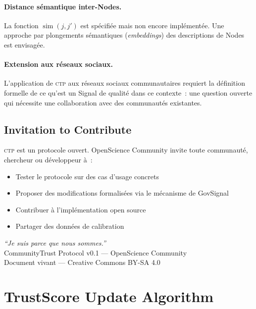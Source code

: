 \documentclass[12pt,a4paper]{article}
\theoremstyle{definition}
\theoremstyle{plain}
\theoremstyle{remark}
\newcommand{\CTP}{\textsc{ctp}}
\newcommand{\1}{\mathbf{1}}
\begin{document}
\paragraph{Distance sémantique inter-Nodes.}
La fonction $\operatorname{sim}(j, j')$ est spécifiée mais non encore
implémentée. Une approche par plongements sémantiques (\textit{embeddings}) des
descriptions de Nodes est envisagée.

\paragraph{Extension aux réseaux sociaux.}
L'application de \CTP{} aux réseaux sociaux communautaires requiert la
définition formelle de ce qu'est un Signal de qualité dans ce contexte~:
une question ouverte qui nécessite une collaboration avec des communautés
existantes.

\subsection{Invitation to Contribute}

\CTP{} est un protocole ouvert. OpenScience Community invite toute
communauté, chercheur ou développeur à~:

\begin{itemize}
  \item Tester le protocole sur des cas d'usage concrets
  \item Proposer des modifications formalisées via le mécanisme de GovSignal
  \item Contribuer à l'implémentation open source
  \item Partager des données de calibration
\end{itemize}

\medskip
\begin{center}
\textit{``Je suis parce que nous sommes.''}\\
\medskip
{\small CommunityTrust Protocol v0.1 --- OpenScience Community\\
Document vivant --- Creative Commons BY-SA 4.0}
\end{center}

\appendix
\section{TrustScore Update Algorithm}
\end{document}
